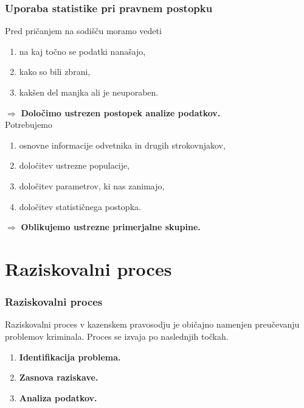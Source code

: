 \documentclass{beamer}
\begin{document}
\begin{frame}
    \frametitle{Uporaba statistike pri pravnem postopku}
    Pred pričanjem na sodišču moramo vedeti
    \begin{enumerate}
        \item na kaj točno se podatki nanašajo,
        \item kako so bili zbrani,
        \item kakšen del manjka ali je neuporaben.
    \end{enumerate}
    $\Rightarrow$ \textbf{Določimo ustrezen postopek analize podatkov.}\\ \vspace{3mm}
    Potrebujemo
    \begin{enumerate}
        \item osnovne informacije odvetnika in drugih strokovnjakov,
        \item določitev ustrezne populacije,
        \item določitev parametrov, ki nas zanimajo,
        \item določitev statističnega postopka.
    \end{enumerate}
    $\Rightarrow$ \textbf{Oblikujemo ustrezne primerjalne skupine.}
\end{frame}

\section{Raziskovalni proces}
\begin{frame}
    \frametitle{Raziskovalni proces}
    Raziskovalni proces v kazenskem pravosodju je običajno namenjen preučevanju problemov kriminala. Proces se izvaja po naslednjih točkah.\\ \vspace{2mm}
    \begin{enumerate}
        \item \textbf{Identifikacija problema.\\} 
        \item \textbf{Zasnova raziskave.\\} 
        \item \textbf{Analiza podatkov.\\}
    \end{enumerate}
\end{frame}
\end{document}

